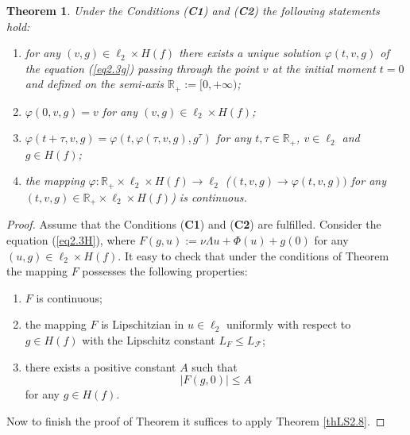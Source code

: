 \documentclass{amsart}%
\newtheorem{theorem}[lemma]{Theorem}
\begin{document}
\begin{theorem}\label{th1.1} Under the Conditions (\textbf{C1}) and
(\textbf{C2}) the following statements hold:
\begin{enumerate}
\item for any $(v,g)\in \ell_{2}\times H(f)$ there exists a unique
solution $\varphi(t,v,g)$ of the equation (\ref{eq2.3g}) passing
through the point $v$ at the initial moment $t=0$ and defined on
the semi-axis $\mathbb R_{+}:=[0,+\infty)$; \item
$\varphi(0,v,g)=v$ for any $(v,g)\in \ell_{2}\times H(f)$; \item
$\varphi(t+\tau,v,g)=\varphi(t,\varphi(\tau,v,g),g^{\tau})$ for
any $t,\tau\in \mathbb R_{+}$, $v\in \ell_{2}$ and $g\in H(f)$;
 \item the mapping
$\varphi :\mathbb R_{+}\times \ell_{2}\times H(f)\to \ell_{2}$
($(t,v,g)\to \varphi(t,v,g))$ for any $(t,v,g)\in \mathbb
R_{+}\times \ell_{2}\times H(f)$) is continuous.
\end{enumerate}
\end{theorem}
\begin{proof}
Assume that the Conditions (\textbf{C1}) and (\textbf{C2}) are
fulfilled. Consider the equation (\ref{eq2.3H}), where
$F(g,u):=\nu \Lambda u +\Phi(u)+g(0)$ for any $(u,g)\in
\ell_{2}\times H(f)$. It easy to check that under the conditions
of Theorem the mapping $F$ possesses the following properties:
\begin{enumerate}
\item $F$ is continuous; \item the mapping $F$ is Lipschitzian in
$u\in \ell_{2}$ uniformly with respect to $g\in H(f)$ with the
Lipschitz constant $L_{F}\le L_{\mathcal F}$; \item there exists a
positive constant $A$ such that
\begin{equation}\label{eqA1}
|F(g,0)|\le A
\end{equation}
for any $g\in H(f)$.
\end{enumerate}

Now to finish the proof of Theorem it suffices to apply Theorem
\ref{thLS2.8}.
\end{proof}
\end{document}
